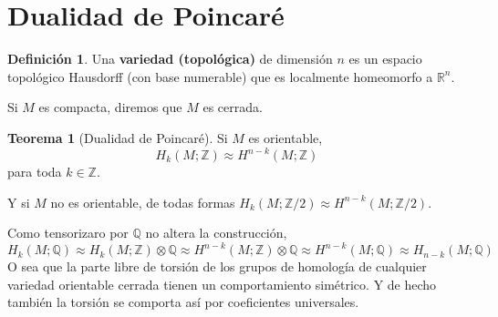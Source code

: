 \documentclass[spanish]{book}
\theoremstyle{definition}
\newtheorem*{defn}{Definición}
\newtheorem*{teo}{Teorema}
\newcommand{\R}{\mathbb{R}}
\newcommand{\Z}{\mathbb{Z}}
\newcommand{\Q}{\mathbb{Q}}
\begin{document}
\section{Dualidad de Poincaré}
\begin{defn}
	Una \textbf{variedad (topológica)} de dimensión $n$ es un espacio topológico Hausdorff (con base numerable) que es localmente homeomorfo a $\R^n$.
\end{defn}
Si $M$ es compacta, diremos que $M$ es cerrada.
\begin{teo}[Dualidad de Poincaré]
	Si $M$ es orientable, \[H_k(M;\Z)\approx H^{n-k}(M;\Z)\] para toda $k\in\Z$.
\end{teo}
Y si $M$ no es orientable, de todas formas $H_k(M;\Z/2)\approx H^{n-k}(M;\Z/2)$.

Como tensorizaro por $\Q$ no altera la construcción,
\[H_k(M;\Q)\approx H_k(M;\Z)\otimes\Q\approx H^{n-k}(M;\Z)\otimes\Q\approx H^{n-k}(M;\Q)\approx H_{n-k}(M;\Q)\]
O sea que la parte libre de torsión de los grupos de homología de cualquier variedad orientable cerrada tienen un comportamiento simétrico. Y de hecho también la torsión se comporta así por coeficientes universales.
\end{document}
